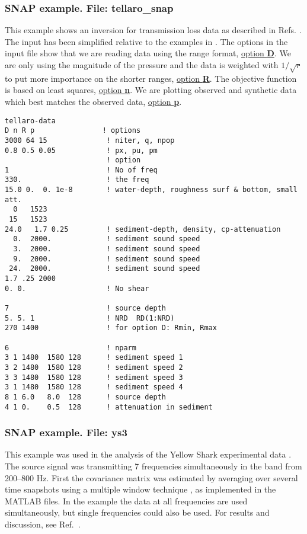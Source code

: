 \documentclass{saclantc}
\begin{document}
\subsubsection{SNAP example. File: {\bf tellaro\_snap}}
\label{se:tel}
This example shows an inversion for transmission loss data 
as described in Refs. \cite{gerstoft:asa95,lambert}. 
The input has been simplified relative to the examples in
\cite{gerstoft:asa95,lambert}. 
The options in the input file show that we are reading data using the range format,
\underline{option {\bf D}}. We are
only using the magnitude of the pressure and the data is weighted with
$1/\sqrt{r}$ to put more importance on the shorter ranges, 
\underline{option {\bf R}}.
The objective function is based on least squares, \underline{option {\bf n}}.
We are plotting  observed  and  synthetic data which best
matches the observed data,  \underline{option {\bf p}}.
 
\small
\begin{verbatim}
tellaro-data
D n R p                ! options 
3000 64 15              ! niter, q, npop
0.8 0.5 0.05            ! px, pu, pm
                        ! option
1                       ! No of freq
330.                    ! the freq
15.0 0.  0. 1e-8        ! water-depth, roughness surf & bottom, small att.
  0   1523           
 15   1523  
24.0   1.7 0.25         ! sediment-depth, density, cp-attenuation 
  0.  2000.             ! sediment sound speed
  3.  2000.             ! sediment sound speed
  9.  2000.             ! sediment sound speed
 24.  2000.             ! sediment sound speed
1.7 .25 2000
0. 0.                   ! No shear

7                       ! source depth
5. 5. 1                 ! NRD  RD(1:NRD)
270 1400                ! for option D: Rmin, Rmax 

6                       ! nparm         
3 1 1480  1580 128      ! sediment speed 1
3 2 1480  1580 128      ! sediment speed 2
3 3 1480  1580 128      ! sediment speed 3
3 1 1480  1580 128      ! sediment speed 4
8 1 6.0   8.0  128      ! source depth
4 1 0.    0.5  128      ! attenuation in sediment
 \end{verbatim}
\normalsize

\subsubsection{SNAP example. File: {\bf ys3}}
\label{se:ys3}
This example was used in the analysis of the Yellow Shark experimental
data \cite{hermand:ieee96}. The source signal was transmitting 7
frequencies simultaneously in the band from 200--800 Hz. First the
covariance matrix was estimated by averaging over several time
snapshots using a multiple window technique 
\cite{thompson:icassp94,meckl:icassp95}, as implemented in
the MATLAB files. 
In the example the data at all frequencies are used simultaneously,
but single frequencies could also be used. 
For results and discussion, see Ref.~\cite{hermand:ieee96}.
\end{document}
